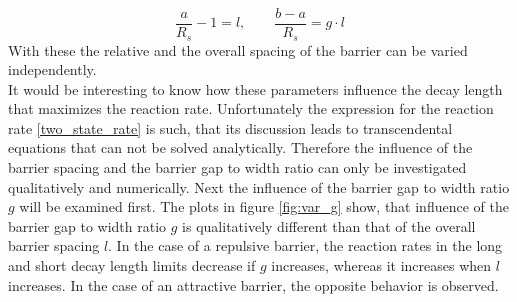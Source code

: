 \begin{equation}
    \frac{a}{R_s} - 1 = l, \qquad \frac{b-a}{R_s} = g \cdot l
    \label{spacing_variables}
\end{equation}
With these the relative and the overall spacing of the barrier can be varied independently. \\
It would be interesting to know how these parameters influence the decay length that maximizes the reaction rate. Unfortunately the expression for the reaction rate \eqref{two_state_rate} is such, that its discussion leads to transcendental equations that can not be solved analytically. Therefore the influence of the barrier spacing and the barrier gap to width ratio can only be investigated qualitatively and numerically. Next the influence of the barrier gap to width ratio $g$ will be examined first. The plots in figure \ref{fig:var_g} show, that influence of the barrier gap to width ratio $g$ is qualitatively different than that of the overall barrier spacing $l$. In the case of a repulsive barrier, the reaction rates in the long and short decay length limits decrease if $g$ increases, whereas it increases when $l$ increases. In the case of an attractive barrier, the opposite behavior is observed. \\
